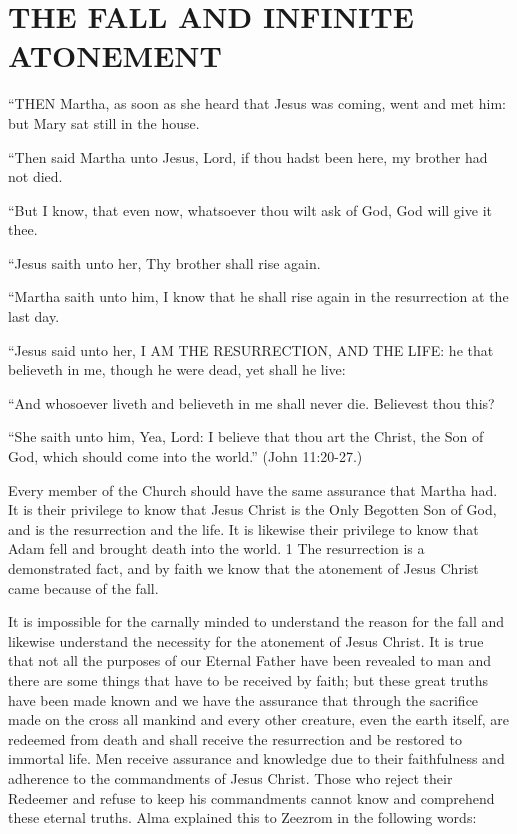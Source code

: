 \chapter{THE FALL AND INFINITE ATONEMENT}

``THEN Martha, as soon as she heard that Jesus was coming, went and met him: but Mary sat
still in the house.

``Then said Martha unto Jesus, Lord, if thou hadst been here, my brother had not died.

``But I know, that even now, whatsoever thou wilt ask of God, God will give it thee.

``Jesus saith unto her, Thy brother shall rise again.

``Martha saith unto him, I know that he shall rise again in the resurrection at the last day.

``Jesus said unto her, I AM THE RESURRECTION, AND THE LIFE: he that believeth in
me, though he were dead, yet shall he live:

``And whosoever liveth and believeth in me shall never die. Believest thou this?

``She saith unto him, Yea, Lord: I believe that thou art the Christ, the Son of God, which
should come into the world.'' (John 11:20-27.)

Every member of the Church should have the same assurance that Martha had. It is their
privilege to know that Jesus Christ is the Only Begotten Son of God, and is the resurrection
and the life. It is likewise their privilege to know that Adam fell and brought death into the
world. 1 The resurrection is a demonstrated fact, and by faith we know that the atonement of
Jesus Christ came because of the fall.

It is impossible for the carnally minded to understand the reason for the fall and likewise
understand the necessity for the atonement of Jesus Christ. It is true that not all the purposes
of our Eternal Father have been revealed to man and there are some things that have to be
received by faith; but these great truths have been made known and we have the assurance
that through the sacrifice made on the cross all mankind and every other creature, even the
earth itself, are redeemed from death and shall receive the resurrection and be restored to
immortal life. Men receive assurance and knowledge due to their faithfulness and adherence
to the commandments of Jesus Christ. Those who reject their Redeemer and refuse to keep
his commandments cannot know and comprehend these eternal truths. Alma explained this to
Zeezrom in the following words:


